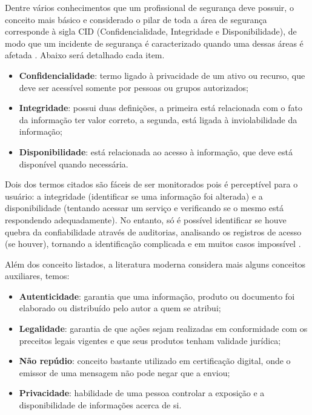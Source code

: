 \documentclass[
	12pt,				
	openright,		
	twoside,	
	a4paper,
	english,	
	brazil	
	]{abntex2}
\begin{document}
Dentre vários conhecimentos que um profissional de segurança deve possuir, o conceito mais básico e considerado o pilar de toda a área de segurança corresponde à sigla CID (Confidencialidade, Integridade e Disponibilidade), de modo que um incidente de segurança é caracterizado quando uma dessas áreas é afetada \cite{seg-redes-sistemas}. Abaixo será detalhado cada item.

\begin{itemize}
 \item \textbf{Confidencialidade}: termo ligado à privacidade de um ativo ou recurso, que deve ser acessível somente por pessoas ou grupos autorizados;
 \item \textbf{Integridade}: possui duas definições, a primeira está relacionada com o fato da informação ter valor correto, a segunda, está ligada à inviolabilidade da informação;
 \item \textbf{Disponibilidade}: está relacionada ao acesso à informação, que deve está disponível quando necessária.
\end{itemize}

Dois dos termos citados são fáceis de ser monitorados pois é perceptível para o usuário: a integridade (identificar se uma informação foi alterada) e a disponibilidade (tentando acessar um serviço e verificando se o mesmo está respondendo adequadamente). No entanto, só é possível identificar se houve quebra da confiabilidade através de auditorias, analisando os registros de acesso (se houver), tornando a identificação complicada e em muitos casos impossível \cite{seg-redes-sistemas}.

Além dos conceito listados, a literatura moderna considera mais alguns conceitos auxiliares, temos:

\begin{itemize}
 \item \textbf{Autenticidade}: garantia que uma informação, produto ou documento foi elaborado ou distribuído pelo autor a quem se atribui;
 \item \textbf{Legalidade}: garantia de que ações sejam realizadas em conformidade com os preceitos legais vigentes e que seus produtos tenham validade jurídica;
 \item \textbf{Não repúdio}: conceito bastante utilizado em certificação digital, onde o emissor de uma mensagem não pode negar que a enviou;
 \item \textbf{Privacidade}: habilidade de uma pessoa controlar a exposição e a disponibilidade de informações acerca de si.
\end{itemize}
\end{document}
